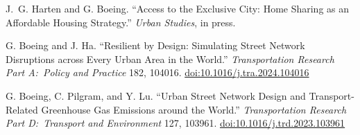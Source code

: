     \begin{tablist}




        \item[2024] \tab{}J.~G. Harten and G. Boeing. \enquote{Access to the Exclusive City: Home Sharing as an Affordable Housing Strategy.} \textit{Urban Studies}, in press.

        \item[2024] \tab{}G. Boeing and J. Ha. \enquote{Resilient by Design: Simulating Street Network Disruptions across Every Urban Area in the World.} \textit{Transportation Research Part A:\ Policy and Practice} 182, 104016. \href{https://doi.org/10.1016/j.tra.2024.104016}{doi:10.1016/j.tra.2024.104016}

        \item[2024] \tab{}G. Boeing, C. Pilgram, and Y. Lu. \enquote{Urban Street Network Design and Transport-Related Greenhouse Gas Emissions around the World.} \textit{Transportation Research Part D:\ Transport and Environment} 127, 103961. \href{https://doi.org/10.1016/j.trd.2023.103961}{doi:10.1016/j.trd.2023.103961}


\end{tablist}
